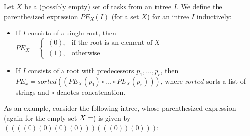 \begin{definition}
  Let $X$ be a (possibly empty) set of tasks from an intree $I$.
  We define the parenthesized expression $PE_X(I)$ (for a set $X$) for an intree $I$ inductively:
  \begin{itemize}
  \item If $I$ consists of a single root, then 
    $
    PE_X =
    \begin{cases}
      (0), & \text{if the root is an element of } X \\
      (1), & \text{otherwise}
    \end{cases}
    $
  \item If $I$ consists of a root with predecessors $p_1,\dots,p_r$, then $PE_x = sorted(\left( PE_X(p_1) \circ \dots \circ PE_X(p_r) \right))$,
    where $sorted$ sorts a list of strings and $\circ$ denotes concatenation.
  \end{itemize}
\end{definition}

As an example, consider the following intree, whose parenthesized expression (again for the empty set $X=\empty$) is given by 
$
\left(  
  \left( 
    \left(
      \left( 0 \right)
      \left( 0 \right)
      \left( 0 \right)
      \left( 0 \right)
    \right)
  \right)
  \left( 
    \left( 
      \left( 0 \right)
    \right)
    \left( 0 \right)
  \right)
\right)
$:

\begin{center}
\end{center}

